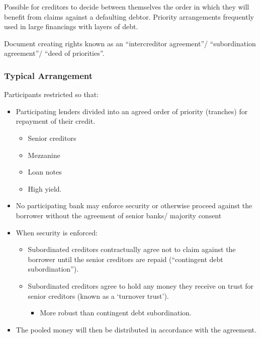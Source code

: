\documentclass[
]{article}
\providecommand{\tightlist}{%
  \setlength{\itemsep}{0pt}\setlength{\parskip}{0pt}}
\begin{document}
Possible for creditors to decide between themselves the order in which
they will benefit from claims against a defaulting debtor. Priority
arrangements frequently used in large financings with layers of debt.

Document creating rights known as an ``intercreditor agreement''/
``subordination agreement''/ ``deed of priorities''.

\hypertarget{typical-arrangement}{%
\subsubsection{Typical Arrangement}\label{typical-arrangement}}

Participants restricted so that:

\begin{itemize}
\tightlist
\item
  Participating lenders divided into an agreed order of priority
  (tranches) for repayment of their credit.

  \begin{itemize}
  \tightlist
  \item
    Senior creditors
  \item
    Mezzanine
  \item
    Loan notes
  \item
    High yield.
  \end{itemize}
\item
  No participating bank may enforce security or otherwise proceed
  against the borrower without the agreement of senior banks/ majority
  consent
\item
  When security is enforced:

  \begin{itemize}
  \tightlist
  \item
    Subordinated creditors contractually agree not to claim against the
    borrower until the senior creditors are repaid (``contingent debt
    subordination'').
  \item
    Subordinated creditors agree to hold any money they receive on trust
    for senior creditors (known as a `turnover trust').

    \begin{itemize}
    \tightlist
    \item
      More robust than contingent debt subordination.
    \end{itemize}
  \end{itemize}
\item
  The pooled money will then be distributed in accordance with the
  agreement.
\end{itemize}
\end{document}
